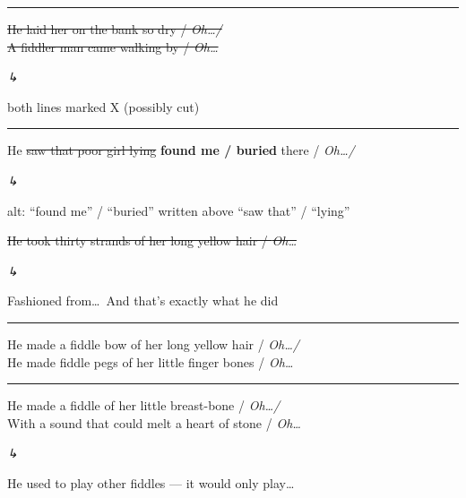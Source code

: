 \documentclass[11pt, a4paper]{article}
\newcommand{\struck}[1]{{\color{strikegray}\sout{#1}}}
\newcommand{\ins}[1]{{\bfseries #1}}
\newcommand{\cutline}[1]{%
  {\color{strikegray}\sout{#1}%
  \enspace{\ttfamily\scriptsize[X]}}%
}
\newenvironment{annotation}{%
  \par\noindent\hspace{1em}%
  \begin{minipage}[t]{0.82\linewidth}%
  \ttfamily\footnotesize\color{annotred}\itshape
  {\symbolfont ↳}\enspace\ignorespaces
}{%
  \end{minipage}\par\smallskip%
}
\newenvironment{songverse}{%
  \vspace{0.5em}\noindent%
}{%
  \vspace{0.5em}\par%
}
\begin{document}
\medskip\hrule\medskip

\begin{songverse}
\begin{bracketgroup}
\cutline{He laid her on the bank so dry / \textit{Oh\ldots /}}\\
\cutline{A fiddler man came walking by / \textit{Oh\ldots}}
\end{bracketgroup}
\begin{annotation}
both lines marked X (possibly cut)
\end{annotation}
\end{songverse}

\medskip\hrule\medskip

\begin{songverse}
\begin{bracketgroup}
He \struck{saw that poor girl lying} \ins{found me / buried} there / \textit{Oh\ldots /}
\begin{annotation}
alt: ``found me'' / ``buried'' written above ``saw that'' / ``lying''
\end{annotation}
\cutline{He took thirty strands of her long yellow hair / \textit{Oh\ldots}}
\begin{annotation}
Fashioned from\ldots\ And that's exactly what he did
\end{annotation}
\end{bracketgroup}
\end{songverse}

\medskip\hrule\medskip

\begin{songverse}
\begin{bracketgroup}
He made a fiddle bow of her long yellow hair / \textit{Oh\ldots /}\\
He made fiddle pegs of her little finger bones / \textit{Oh\ldots}
\end{bracketgroup}
\end{songverse}

\medskip\hrule\medskip

\begin{songverse}
\begin{bracketgroup}
He made a fiddle of her little breast-bone / \textit{Oh\ldots /}\\
With a sound that could melt a heart of stone / \textit{Oh\ldots}
\begin{annotation}
He used to play other fiddles --- it would only play\ldots
\end{annotation}
\end{bracketgroup}
\end{songverse}
\end{document}
